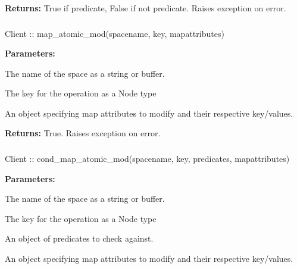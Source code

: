\noindent\textbf{Returns:}
True if predicate, False if not predicate.  Raises exception on error.

\subsubsection{}
\label{api:nodejs:map_atomic_mod}
\begin{javascriptcode}
Client :: map_atomic_mod(spacename, key, mapattributes)
\end{javascriptcode}


\noindent\textbf{Parameters:}
\begin{description}[labelindent=\widthof{{\code{mapattributes}}},leftmargin=*,noitemsep,nolistsep,align=right]
\item[\code{spacename}] The name of the space as a string or buffer.
\item[\code{key}] The key for the operation as a Node type
\item[\code{mapattributes}] An object specifying map attributes to modify and their respective key/values.
\end{description}

\noindent\textbf{Returns:}
True.  Raises exception on error.

\subsubsection{}
\label{api:nodejs:cond_map_atomic_mod}
\begin{javascriptcode}
Client :: cond_map_atomic_mod(spacename, key, predicates, mapattributes)
\end{javascriptcode}


\noindent\textbf{Parameters:}
\begin{description}[labelindent=\widthof{{\code{mapattributes}}},leftmargin=*,noitemsep,nolistsep,align=right]
\item[\code{spacename}] The name of the space as a string or buffer.
\item[\code{key}] The key for the operation as a Node type
\item[\code{predicates}] An object of predicates to check against.
\item[\code{mapattributes}] An object specifying map attributes to modify and their respective key/values.
\end{description}

